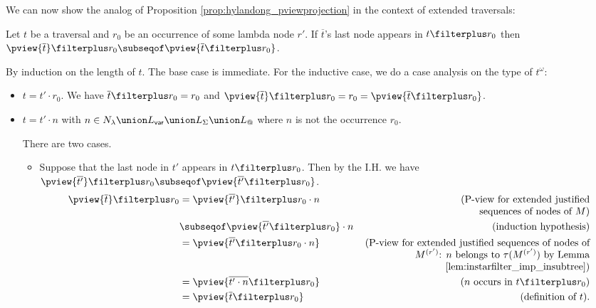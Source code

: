 We can now show the analog of Proposition \ref{prop:hylandong_pviewprojection} in the context of extended traversals:
\begin{proposition}
\label{prop:analog_pviewprojection} Let $t$ be a traversal and $r_0$
be an occurrence of some lambda node $r'$.
If $\overline{t}$'s last node appears in $t\filterplus r_0$ then
 $\pview{ \overline{t}}  \filterplus r_0 \subseqof \pview{ \overline{t}\filterplus
 r_0}$.
\end{proposition}
\proof
By induction on the length of $t$. The base case is immediate. For the inductive case,
we do a case analysis on the type of $t^\omega$:
    \begin{itemize}
    \item $t =  t' \cdot r_0$. We have $\overline{t} \filterplus r_0 = r_0$ and
     $\pview{\overline{t}} \filterplus r_0 = r_0 = \pview{\overline{t} \filterplus r_0}$.

    \item $t = t' \cdot n$ with $n \in N_\lambda \union L_{\sf var} \union
    L_\Sigma \union L_@$ where $n$ is not the occurrence $r_0$.

    There are two cases.
    \begin{itemize}
        \item Suppose that the last node in $t'$ appears in $t\filterplus r_0$. Then
        by the I.H. we have $\pview{\overline{t'}} \filterplus  r_0 \subseqof \pview{\overline{t'} \filterplus  r_0}$.
            \begin{align*}
            \pview{\overline{t}} \filterplus r_0
                &=  \pview{\overline{t'}} \filterplus r_0 \cdot n  & \parbox[t]{8cm}{(\raggedleft P-view for extended justified\\sequences of nodes of $M$)} \\
                &\subseqof  \pview{\overline{t'} \filterplus  r_0} \cdot n            & (\mbox{induction hypothesis}) \\
                &=  \pview{\overline{t'} \filterplus  r_0 \cdot n} & \parbox[t]{8cm}{\raggedleft (P-view for extended justified sequences of nodes of $M^{(r')}$: $n$ belongs to $\tau(M^{(r')})$ by Lemma \ref{lem:instarfilter_imp_insubtree})} \\
                &=  \pview{\overline{t' \cdot n} \filterplus  r_0  }   & (\mbox{$n$ occurs in $t\filterplus r_0$}) \\
                &= \pview{\overline{t} \filterplus  r_0  }     & (\mbox{definition of } t).
            \end{align*}


\end{itemize}
\end{itemize}
